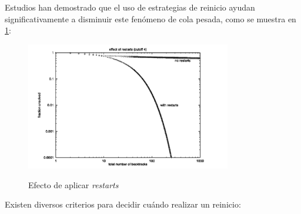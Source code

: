 Estudios han demostrado que el uso de estrategias de reinicio ayudan significativamente a disminuir este fen\'omeno de cola pesada, como se muestra en \ref{fig:restart_efects}:

\begin{figure}[ht]
    \centering
    \includegraphics[width=0.8\textwidth]{Graphics/restart_effects.png}
    \caption{Efecto de aplicar \textit{restarts}}
    \cite{oliveras2009dpll_cdcl}
    \label{fig:restart_efects}
\end{figure}

Existen diversos criterios para decidir cuándo realizar un reinicio:

